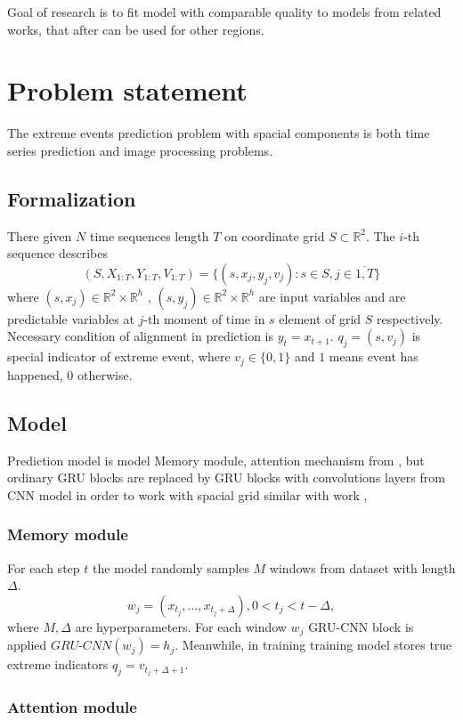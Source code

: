 \documentclass{article}
\begin{document}
Goal of research is to fit model with comparable quality to models from related works, that after can be used for other regions.
 
\section{Problem statement}
The extreme events prediction problem with spacial components is both time series prediction and  image processing problems. 
\subsection{Formalization}


There given $N$ time sequences length $T$ on coordinate grid $S  \subset \mathbb{R}^2$. The $i$-th sequence describes 
$$ (S , X_{1:T} , Y_{1:T}, V_{1:T}) =\{ (s, x_j,y_j, v_j) : s \in S , j \in \overline{1,T} \}$$  
where $(s,x_j) \in \mathbb{R}^2 \times \mathbb{R}^{h}$ , $(s,y_j) \in \mathbb{R}^2 \times \mathbb{R}^{h}$ are input variables  and  are predictable variables at $j$-th moment of time in $s$ element of grid $S$  respectively. Necessary condition of alignment in prediction is $y_t = x_{t+1}$. $q_j = (s, v_j)$ is special indicator of extreme event, where $v_j \in \{0,1\}$ and $1$ means event has happened, $0$ otherwise.

\subsection{Model}
Prediction model is model Memory module, attention mechanism  from \cite{EVL:1} , but ordinary GRU blocks are replaced by GRU blocks with convolutions layers from CNN model in order to work with spacial grid similar with work \cite{LSTMCNN:2}, \cite{GRUCNN:3}

\subsubsection{Memory module}
For each step $t$ the model randomly samples $M$ windows from dataset with length $\Delta$. 
$$w_j= (x_{t_j}, \dots, x_{t_j + \Delta}), 0< t_j < t - \Delta, $$
where $M, \Delta$ are hyperparameters.
For each window $w_j$ GRU-CNN block is applied $\textit{GRU-CNN}(w_j) = h_j$. Meanwhile, in training training model stores true extreme indicators $q_j = v_{t_j + \Delta + 1}$.
\subsubsection{Attention module}
\end{document}
